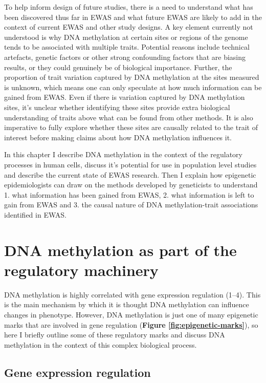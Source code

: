 \documentclass[11pt,twoside]{bristolthesis}
\begin{document}
To help inform design of future studies, there is a need to understand what has been discovered thus far in EWAS and what future EWAS are likely to add in the context of current EWAS and other study designs. A key element currently not understood is why DNA methylation at certain sites or regions of the genome tends to be associated with multiple traits. Potential reasons include technical artefacts, genetic factors or other strong confounding factors that are biasing results, or they could genuinely be of biological importance. Further, the proportion of trait variation captured by DNA methylation at the sites measured is unknown, which means one can only speculate at how much information can be gained from EWAS. Even if there is variation captured by DNA methylation sites, it's unclear whether identifying these sites provide extra biological understanding of traits above what can be found from other methods. It is also imperative to fully explore whether these sites are causally related to the trait of interest before making claims about how DNA methylation influences it.

In this chapter I describe DNA methylation in the context of the regulatory processes in human cells, discuss it's potential for use in population level studies and describe the current state of EWAS research. Then I explain how epigenetic epidemiologists can draw on the methods developed by geneticists to understand 1. what information has been gained from EWAS, 2. what information is left to gain from EWAS and 3. the causal nature of DNA methylation-trait associations identified in EWAS.

\hypertarget{dna-methylation-as-part-of-the-regulatory-machinery}{%
\section{DNA methylation as part of the regulatory machinery}\label{dna-methylation-as-part-of-the-regulatory-machinery}}

DNA methylation is highly correlated with gene expression regulation (1--4). This is the main mechanism by which it is thought DNA methylation can influence changes in phenotype. However, DNA methylation is just one of many epigenetic marks that are involved in gene regulation (\textbf{Figure \ref{fig:epigenetic-marks}}), so here I briefly outline some of these regulatory marks and discuss DNA methylation in the context of this complex biological process.

\hypertarget{gene-expression-regulation}{%
\subsection{Gene expression regulation}\label{gene-expression-regulation}}
\end{document}
